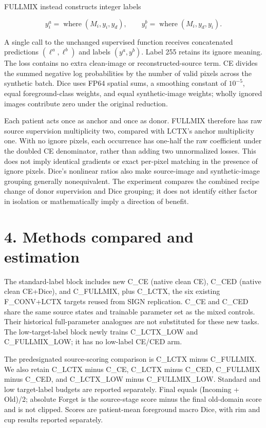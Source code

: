 \documentclass[
]{article}
\begin{document}
FULLMIX instead constructs integer labels

\[y_i^a=\operatorname{where}(M_i,y_i,y_d),\qquad y_i^b=\operatorname{where}(M_i,y_d,y_i).\]

A single call to the unchanged supervised function receives concatenated
predictions \((\ell^a,\ell^b)\) and labels \((y^a,y^b)\). Label 255
retains its ignore meaning. The loss contains no extra clean-image or
reconstructed-source term. CE divides the summed negative log
probabilities by the number of valid pixels across the synthetic batch.
Dice uses FP64 spatial sums, a smoothing constant of \(10^{-5}\), equal
foreground-class weights, and equal synthetic-image weights; wholly
ignored images contribute zero under the original reduction.

Each patient acts once as anchor and once as donor. FULLMIX therefore
has raw source supervision multiplicity two, compared with LCTX's anchor
multiplicity one. With no ignore pixels, each occurrence has one-half
the raw coefficient under the doubled CE denominator, rather than adding
two unnormalized losses. This does not imply identical gradients or
exact per-pixel matching in the presence of ignore pixels. Dice's
nonlinear ratios also make source-image and synthetic-image grouping
generally nonequivalent. The experiment compares the combined recipe
change of donor supervision and Dice grouping; it does not identify
either factor in isolation or mathematically imply a direction of
benefit.

\section{4. Methods compared and
estimation}\label{methods-compared-and-estimation}

The standard-label block includes new C\_CE (native clean CE), C\_CED
(native clean CE+Dice), and C\_FULLMIX, plus C\_LCTX, the six existing
F\_CONV+LCTX targets reused from SIGN replication. C\_CE and C\_CED
share the same source states and trainable parameter set as the mixed
controls. Their historical full-parameter analogues are not substituted
for these new tasks. The low-target-label block newly trains
C\_LCTX\_LOW and C\_FULLMIX\_LOW; it has no low-label CE/CED arm.

The predesignated source-scoring comparison is C\_LCTX minus C\_FULLMIX.
We also retain C\_LCTX minus C\_CE, C\_LCTX minus C\_CED, C\_FULLMIX
minus C\_CED, and C\_LCTX\_LOW minus C\_FULLMIX\_LOW. Standard and low
target-label budgets are reported separately. Final equals (Incoming +
Old)/2; absolute Forget is the source-stage score minus the final
old-domain score and is not clipped. Scores are patient-mean foreground
macro Dice, with rim and cup results reported separately.
\end{document}
